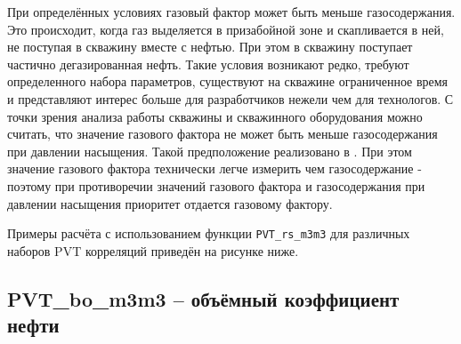 При определённых условиях газовый фактор может быть меньше газосодержания. Это происходит, когда газ выделяется в призабойной зоне и скапливается в ней, не поступая в скважину вместе с нефтью. При этом в скважину поступает частично дегазированная нефть. Такие условия возникают редко, требуют определенного набора параметров, существуют на скважине ограниченное время и представляют интерес больше для разработчиков нежели чем для технологов. С точки зрения анализа работы скважины и скважинного оборудования можно считать, что значение газового фактора не может быть меньше газосодержания при давлении насыщения. Такой предположение реализовано в \unf{}. При этом значение газового фактора технически легче измерить чем газосодержание - поэтому при противоречии значений газового фактора и газосодержания при давлении насыщения приоритет отдается газовому фактору. 


Примеры расчёта с использованием функции \texttt{PVT_rs_m3m3} для различных наборов PVT корреляций приведён на рисунке ниже.

\newcommand{\RsDataFile}{data/Rs_P_data.txt}


\subsection{PVT\_bo\_m3m3 – объёмный коэффициент нефти}

